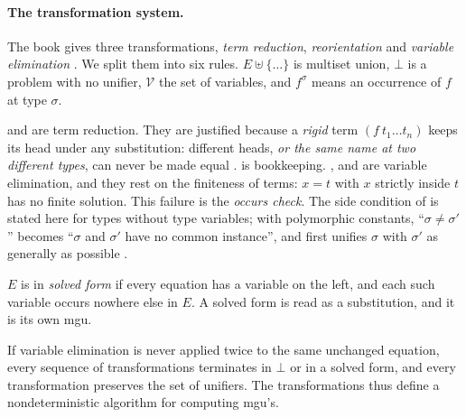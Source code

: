 \paragraph{The transformation system.} The book gives three transformations, \emph{term reduction},
\emph{reorientation} and \emph{variable elimination} . We split them into six
rules. $E\uplus\{\dots\}$ is multiset union, $\bot$ is a problem
with no unifier, $\mathcal V$ the set of variables, and $f^\sigma$ means an occurrence of $f$ at type $\sigma$.
 and  are term reduction. They are justified because a \emph{rigid} term
$(f\ t_1\dots t_n)$ keeps its head under any substitution: different heads, \emph{or the same name at two
different types}, can never be made equal .  is bookkeeping.
,  and  are variable elimination, and they rest on the
finiteness of terms: $x=t$ with $x$ strictly inside $t$ has no finite solution. This failure is the
\emph{occurs check}. The side condition of  is stated here for types without type
variables; with polymorphic constants, ``$\sigma\neq\sigma'$'' becomes ``$\sigma$ and $\sigma'$ have no common
instance'', and  first unifies $\sigma$ with $\sigma'$ as generally as possible
.

\begin{definition}
$E$ is in \emph{solved form} if every equation has a variable on the left, and each such variable occurs
nowhere else in $E$. A solved form is read as a substitution, and it is its own mgu.
\end{definition}
\begin{theorem}
If variable elimination is never applied twice to the same unchanged equation, every sequence of
transformations terminates in $\bot$ or in a solved form, and every transformation preserves the set of
unifiers. The transformations thus define a nondeterministic algorithm for computing mgu's.
\end{theorem}

